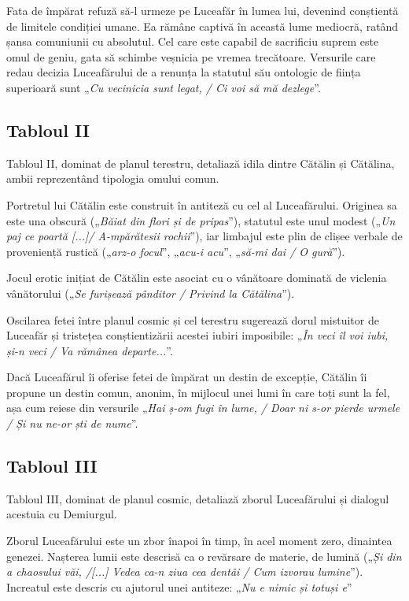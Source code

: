 \documentclass{article}
\newcommand{\qu}[1]{„\emph{#1}”}
\begin{document}
Fata de împărat refuză să-l urmeze pe Luceafăr în lumea lui, devenind conștientă de limitele condiției umane. Ea rămâne captivă în această lume mediocră, ratând șansa comuniunii cu absolutul. Cel care este capabil de sacrificiu suprem este omul de geniu, gata să schimbe veșnicia pe vremea trecătoare. Versurile care redau decizia Luceafărului de a renunța la statutul său ontologic de ființa superioară sunt \qu{Cu vecinicia sunt legat, / Ci voi să mă dezlege}.
\subsection{Tabloul II}
Tabloul II, dominat de planul terestru, detaliază idila dintre Cătălin și Cătălina, ambii reprezentând tipologia omului comun.

Portretul lui Cătălin este construit în antiteză cu cel al Luceafărului. Originea sa este una obscură (\qu{Băiat din flori și de pripas}), statutul este unul modest (\qu{Un paj ce poartă [...]/ A-mpărătesii rochii}), iar limbajul este plin de clișee verbale de proveniență rustică (\qu{arz-o focul}, \qu{acu-i acu}, \qu{să-mi dai / O gură}).

Jocul erotic inițiat de Cătălin este asociat cu o vânătoare dominată de viclenia vânătorului (\qu{Se furișează pânditor / Privind la Cătălina}).

Oscilarea fetei între planul cosmic și cel terestru sugerează dorul mistuitor de Luceafăr și tristețea conștientizării acestei iubiri imposibile: \qu{În veci îl voi iubi, și-n veci / Va rămânea departe...}.

Dacă Luceafărul îi oferise fetei de împărat un destin de excepție, Cătălin îi propune un destin comun, anonim, în mijlocul unei lumi în care toți sunt la fel, așa cum reiese din versurile \qu{Hai ș-om fugi în lume, / Doar ni s-or pierde urmele / Și nu ne-or ști de nume}.

\subsection{Tabloul III}
Tabloul III, dominat de planul cosmic, detaliază zborul Luceafărului și dialogul acestuia cu Demiurgul.

Zborul Luceafărului este un zbor înapoi în timp, în acel moment zero, dinaintea genezei. Nașterea lumii este descrisă ca o revărsare de materie, de lumină (\qu{Și din a chaosului văi, /[...] Vedea ca-n ziua cea dentâi / Cum izvorau lumine}). Increatul este descris cu ajutorul unei antiteze: \qu{Nu e nimic și totuși e}
\end{document}
